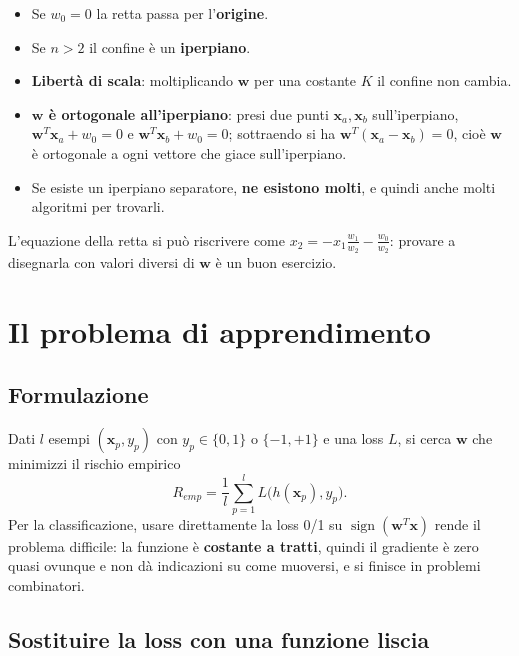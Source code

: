 \begin{itemize}
\tightlist
\item
  Se \(w_0 = 0\) la retta passa per l'\textbf{origine}.
\item
  Se \(n > 2\) il confine è un \textbf{iperpiano}.
\item
  \textbf{Libertà di scala}: moltiplicando \(\mathbf{w}\) per una
  costante \(K\) il confine non cambia.
\item
  \textbf{\(\mathbf{w}\) è ortogonale all'iperpiano}: presi due punti
  \(\mathbf{x}_a, \mathbf{x}_b\) sull'iperpiano,
  \(\mathbf{w}^T\mathbf{x}_a + w_0 = 0\) e
  \(\mathbf{w}^T\mathbf{x}_b + w_0 = 0\); sottraendo si ha
  \(\mathbf{w}^T(\mathbf{x}_a - \mathbf{x}_b) = 0\), cioè \(\mathbf{w}\)
  è ortogonale a ogni vettore che giace sull'iperpiano.
\item
  Se esiste un iperpiano separatore, \textbf{ne esistono molti}, e
  quindi anche molti algoritmi per trovarli.
\end{itemize}

L'equazione della retta si può riscrivere come
\(x_2 = -x_1 \frac{w_1}{w_2} - \frac{w_0}{w_2}\): provare a disegnarla
con valori diversi di \(\mathbf{w}\) è un buon esercizio.

\section{Il problema di
apprendimento}\label{il-problema-di-apprendimento}

\subsection{Formulazione}\label{formulazione}

Dati \(l\) esempi \((\mathbf{x}_p, y_p)\) con \(y_p \in \{0,1\}\) o
\(\{-1,+1\}\) e una loss \(L\), si cerca \(\mathbf{w}\) che minimizzi il
rischio empirico \[
R_{emp} = \frac{1}{l}\sum_{p=1}^{l} L\big(h(\mathbf{x}_p), y_p\big).
\] Per la classificazione, usare direttamente la loss 0/1 su
\(\operatorname{sign}(\mathbf{w}^T\mathbf{x})\) rende il problema
difficile: la funzione è \textbf{costante a tratti}, quindi il gradiente
è zero quasi ovunque e non dà indicazioni su come muoversi, e si finisce
in problemi combinatori.

\subsection{Sostituire la loss con una funzione
liscia}\label{sostituire-la-loss-con-una-funzione-liscia}

